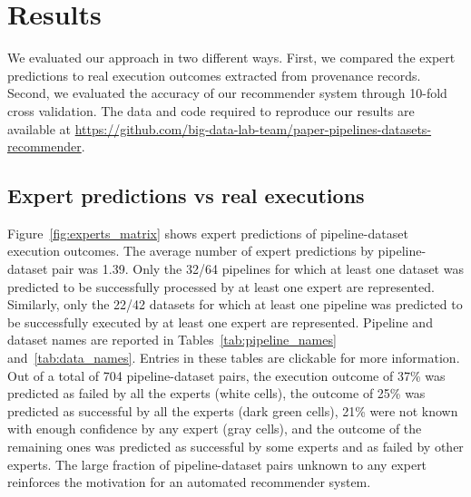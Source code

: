 \documentclass[conference]{IEEEtran}
\begin{document}

\section{Results}

We evaluated our approach in two different ways. First, 
we compared the expert predictions to 
real execution outcomes extracted from provenance records.
Second, we evaluated 
the accuracy of our recommender system through 10-fold cross validation. The data and code required to reproduce our results are available at  \url{https://github.com/big-data-lab-team/paper-pipelines-datasets-recommender}. 

\subsection{Expert predictions vs real executions}


Figure~\ref{fig:experts_matrix} shows expert predictions of
pipeline-dataset execution outcomes. The average number of expert predictions by pipeline-dataset pair was 1.39. Only the 32/64 pipelines for which at
least one dataset was predicted to be successfully processed by at least
one expert are represented.  Similarly, only the 22/42 datasets for which
at least one pipeline was predicted to be successfully executed by at least
one expert are represented. Pipeline and dataset names are reported in Tables~\ref{tab:pipeline_names} and~\ref{tab:data_names}. Entries in these tables are clickable for more information. Out of a total of 704 pipeline-dataset pairs,
the execution outcome of 37\% was predicted as failed by all the experts
(white cells), the outcome of 25\% was predicted as successful by all the
experts (dark green cells), 21\% were not known with enough confidence by
any expert (gray cells), and the outcome of the remaining ones was
predicted as successful by some experts and as failed by other experts. The
large fraction of pipeline-dataset pairs unknown to any expert reinforces
the motivation for an automated recommender system.
\end{document}
